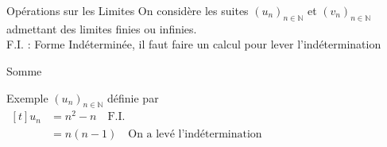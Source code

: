 \documentclass{coursbook}
\begin{document}
    \begin{Gpartie}{Opérations sur les Limites}
        On considère les suites $(u_n)_{n\in\mathbb{N}}$ et $(v_n)_{n\in\mathbb{N}}$ admettant des limites finies ou infinies. \\ F.I. : Forme Indéterminée, il faut faire un calcul pour lever l'indétermination
        \begin{Spartie}{Somme}
            \begin{table}[H] \centering {} 
            \end{table}\pagebreak
            \begin{SSpartie}{Exemple} 
                $(u_n)_{n\in\mathbb{N}}$ définie par $\begin{aligned}[t]u_n&=n^2-n\quad\text{F.I.} \\ &=n(n-1)\quad\text{On a levé l'indétermination}\end{aligned}$


\end{SSpartie}
\end{Spartie}
\end{Gpartie}
\end{document}
